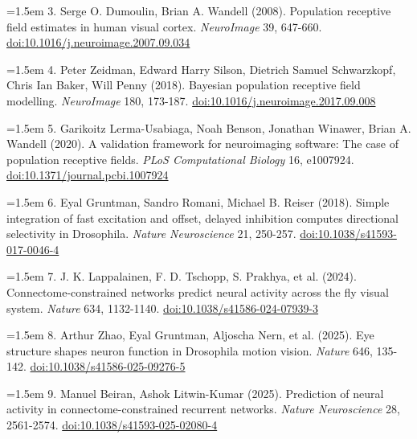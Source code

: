 \documentclass[11pt,letterpaper]{article}
\begin{document}
\noindent\hangindent=1.5em 3. Serge O. Dumoulin, Brian A. Wandell (2008). Population receptive field estimates in human visual cortex. \emph{NeuroImage} 39, 647-660. \href{https://doi.org/10.1016/j.neuroimage.2007.09.034}{doi:10.1016/j.neuroimage.2007.09.034}\par\smallskip

\noindent\hangindent=1.5em 4. Peter Zeidman, Edward Harry Silson, Dietrich Samuel Schwarzkopf, Chris Ian Baker, Will Penny (2018). Bayesian population receptive field modelling. \emph{NeuroImage} 180, 173-187. \href{https://doi.org/10.1016/j.neuroimage.2017.09.008}{doi:10.1016/j.neuroimage.2017.09.008}\par\smallskip

\noindent\hangindent=1.5em 5. Garikoitz Lerma-Usabiaga, Noah Benson, Jonathan Winawer, Brian A. Wandell (2020). A validation framework for neuroimaging software: The case of population receptive fields. \emph{PLoS Computational Biology} 16, e1007924. \href{https://doi.org/10.1371/journal.pcbi.1007924}{doi:10.1371/journal.pcbi.1007924}\par\smallskip

\noindent\hangindent=1.5em 6. Eyal Gruntman, Sandro Romani, Michael B. Reiser (2018). Simple integration of fast excitation and offset, delayed inhibition computes directional selectivity in Drosophila. \emph{Nature Neuroscience} 21, 250-257. \href{https://doi.org/10.1038/s41593-017-0046-4}{doi:10.1038/s41593-017-0046-4}\par\smallskip

\noindent\hangindent=1.5em 7. J. K. Lappalainen, F. D. Tschopp, S. Prakhya, et al. (2024). Connectome-constrained networks predict neural activity across the fly visual system. \emph{Nature} 634, 1132-1140. \href{https://doi.org/10.1038/s41586-024-07939-3}{doi:10.1038/s41586-024-07939-3}\par\smallskip

\noindent\hangindent=1.5em 8. Arthur Zhao, Eyal Gruntman, Aljoscha Nern, et al. (2025). Eye structure shapes neuron function in Drosophila motion vision. \emph{Nature} 646, 135-142. \href{https://doi.org/10.1038/s41586-025-09276-5}{doi:10.1038/s41586-025-09276-5}\par\smallskip

\noindent\hangindent=1.5em 9. Manuel Beiran, Ashok Litwin-Kumar (2025). Prediction of neural activity in connectome-constrained recurrent networks. \emph{Nature Neuroscience} 28, 2561-2574. \href{https://doi.org/10.1038/s41593-025-02080-4}{doi:10.1038/s41593-025-02080-4}\par\smallskip
\end{document}
